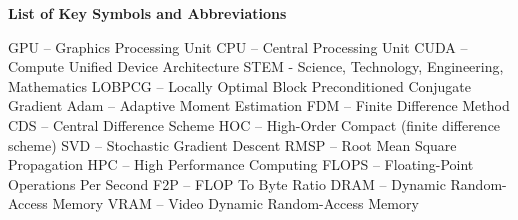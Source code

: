 \noindent
\begingroup
    \fontsize{12pt}{1.5pt}\selectfont
    \textbf{List of Key Symbols and Abbreviations}
\endgroup

\vspace{3mm}

\noindent GPU -- Graphics Processing Unit\newline
CPU -- Central Processing Unit\newline
CUDA -- Compute Unified Device Architecture\newline
STEM - Science, Technology, Engineering, Mathematics\newline
LOBPCG -- Locally Optimal Block Preconditioned Conjugate Gradient\newline
Adam -- Adaptive Moment Estimation\newline
FDM -- Finite Difference Method\newline
CDS -- Central Difference Scheme\newline
HOC -- High-Order Compact (finite difference scheme)\newline
SVD -- Stochastic Gradient Descent \newline
RMSP -- Root Mean Square Propagation\newline
HPC -- High Performance Computing\newline
FLOPS -- Floating-Point Operations Per Second\newline
F2P -- FLOP To Byte Ratio\newline
DRAM -- Dynamic Random-Access Memory\newline
VRAM -- Video Dynamic Random-Access Memory
